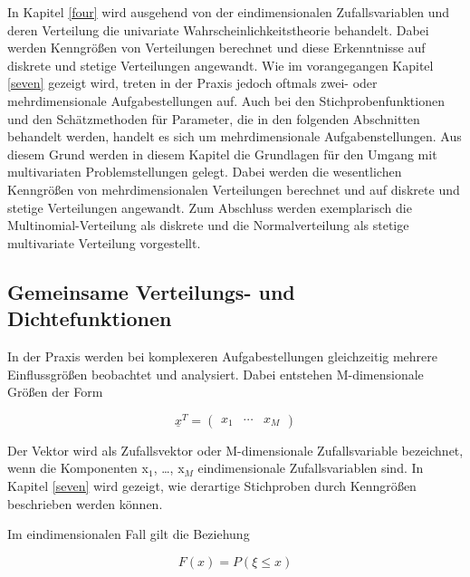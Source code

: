 \noindent In Kapitel \ref{four} wird ausgehend von der eindimensionalen Zufallsvariablen und deren Verteilung die univariate Wahrscheinlichkeitstheorie behandelt. Dabei werden Kenngr\"{o}{\ss}en von Verteilungen berechnet und diese Erkenntnisse auf diskrete und stetige Verteilungen angewandt. Wie im vorangegangen Kapitel \ref{seven} gezeigt wird, treten in der Praxis jedoch oftmals zwei- oder mehrdimensionale Aufgabestellungen auf. Auch bei den Stichprobenfunktionen und den Sch\"{a}tzmethoden f\"{u}r Parameter, die in den folgenden Abschnitten behandelt werden, handelt es sich um mehrdimensionale Aufgabenstellungen. Aus diesem Grund werden in diesem Kapitel die Grundlagen f\"{u}r den Umgang mit multivariaten Problemstellungen gelegt. Dabei werden die wesentlichen Kenngr\"{o}{\ss}en von mehrdimensionalen Verteilungen berechnet und auf diskrete und stetige Verteilungen angewandt. Zum Abschluss werden exemplarisch die Multinomial-Verteilung als diskrete und die Normalverteilung als stetige multivariate Verteilung vorgestellt.

\subsection{Gemeinsame Verteilungs- und Dichtefunktionen}

\noindent In der Praxis werden bei komplexeren Aufgabestellungen gleichzeitig mehrere Einflussgr\"{o}{\ss}en beobachtet und analysiert. Dabei entstehen M-dimensionale Gr\"{o}{\ss}en der Form

\begin{equation}\label{eq:eightone}
\underline{x}^{T} =\left(\begin{array}{ccc} {x_{1} } & {\cdots } & {x_{M} } \end{array}\right)
\end{equation}

\noindent Der Vektor  wird als Zufallsvektor oder M-dimensionale Zufallsvariable bezeichnet, wenn die Komponenten x$_{1}$, {\dots}, x$_{M}$ eindimensionale Zufallsvariablen sind. In Kapitel \ref{seven} wird gezeigt, wie derartige Stichproben durch Kenngr\"{o}{\ss}en beschrieben werden k\"{o}nnen.\newline

\noindent Im eindimensionalen Fall gilt die Beziehung

\begin{equation}\label{eq:eighttwo}
F(x)=P(\xi \le x)
\end{equation}

